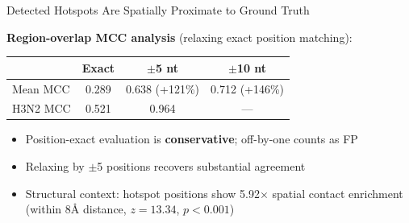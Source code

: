 \documentclass[aspectratio=169,11pt]{beamer}
\begin{document}
\begin{frame}{Detected Hotspots Are Spatially Proximate to Ground Truth}

\textbf{Region-overlap MCC analysis} (relaxing exact position matching):

\begin{center}
\begin{tabular}{lccc}
\toprule
& \textbf{Exact} & \textbf{$\pm$5 nt} & \textbf{$\pm$10 nt} \\
\midrule
Mean MCC & 0.289 & 0.638 \textcolor{pahdgreen}{(+121\%)} & 0.712 \textcolor{pahdgreen}{(+146\%)} \\
H3N2 MCC & 0.521 & 0.964 & --- \\
\bottomrule
\end{tabular}
\end{center}

\vspace{1em}
\begin{itemize}
  \item Position-exact evaluation is \textbf{conservative}; off-by-one counts as FP
  \item Relaxing by $\pm$5 positions recovers substantial agreement
  \item Structural context: hotspot positions show \alert{5.92$\times$} spatial contact enrichment\\
        (within 8\AA{} distance, $z = 13.34$, $p < 0.001$)
\end{itemize}
\end{frame}
\end{document}
